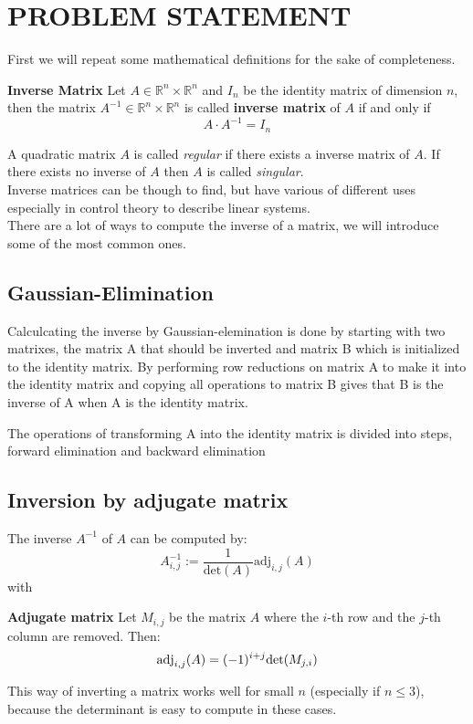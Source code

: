 

\section{PROBLEM STATEMENT}\label{sec:problem}
First we will repeat some mathematical definitions for the sake of completeness.
\begin{definition}
	\textbf{Inverse Matrix}
	Let $A \in \mathbb{R}^n \times \mathbb{R}^n$ and $I_n$ be the identity matrix of dimension $n$, then the matrix $A^{-1} \in \mathbb{R}^n \times \mathbb{R}^n$ is called \textbf{inverse matrix} of $A$ if and only if
	\begin{equation}\label{eq:inverse}
	A \cdot A^{-1} = I_n
	\end{equation}
\end{definition}
A quadratic matrix $A$ is called \emph{regular} if there exists a inverse matrix of $A$. If there exists no inverse of $A$ then $A$ is called \emph{singular}.\\
Inverse matrices can be though to find, but have various of different uses especially in control theory to describe linear systems.  
\vspace{0.2cm}\\
There are a lot of ways to compute the inverse of a matrix, we will introduce some of the most common ones.\\
\subsection*{Gaussian-Elimination}
Calculcating the inverse by Gaussian-elemination is done by starting with two matrixes, the matrix A that should be inverted and matrix B which is initialized to the identity matrix. By performing row reductions on matrix A to make it into the identity matrix and copying all operations to matrix B gives that B is the inverse of A when A is the identity matrix.

The operations of transforming A into the identity matrix is divided into steps, forward elimination and backward elimination

\subsection*{Inversion by adjugate matrix}
The inverse $A^{-1}$ of $A$ can be computed by:
\begin{equation}
	A^{-1}_{i,j} := \frac{1}{\text{det}(A)} \text{adj}_{i,j}(A)
\end{equation}
with
\begin{definition}
	\textbf{Adjugate matrix} Let $M_{i,j}$ be the matrix $A$ where the $i$-th row and the $j$-th column are removed. Then:
	\[ \text{\textnormal{adj}}_{i,j}(A) = (-1)^{i+j} \text{\textnormal{det}}(M_{j,i}) \]
\end{definition}
This way of inverting a matrix works well for small $n$ (especially if $n \leq 3$), because the determinant is easy to compute in these cases.\\
